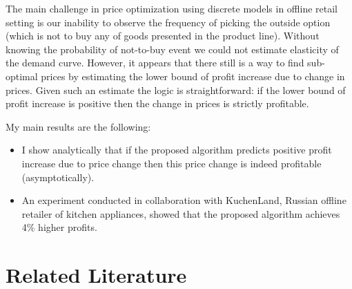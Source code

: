 \documentclass[12pt]{article}
\begin{document}
\par The main challenge in price optimization using discrete models in offline retail setting is our inability to observe the frequency of picking the outside option (which is not to buy any of goods presented in the product line).
Without knowing the probability of not-to-buy event we could not estimate elasticity of the demand curve.
However, it appears that there still is a way to find sub-optimal prices by estimating the lower bound of profit increase due to change in prices.
Given such an estimate the logic is straightforward: if the lower bound of profit increase is positive then the change in prices is strictly profitable.

\par My main results are the following:
\begin{itemize}
\item I show analytically that if the proposed algorithm predicts positive profit increase due to price change then this price change is indeed profitable (asymptotically).
\item An experiment conducted in collaboration with KuchenLand, Russian offline retailer of kitchen appliances, showed that the proposed algorithm achieves 4\% higher profits.
\end{itemize}


\section{Related Literature}\label{sect2}
\end{document}
